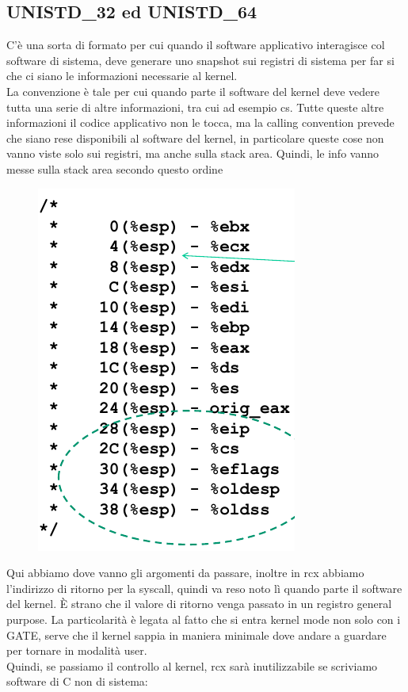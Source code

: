 \documentclass[12pt, oneside]{extbook}
\begin{document}
\subsection{UNISTD\_32 ed UNISTD\_64}
C'è una sorta di formato per cui quando il software applicativo interagisce col software di sistema, deve generare uno snapshot sui registri di sistema per far si che ci siano le informazioni necessarie al kernel.\\ La convenzione è tale per cui quando parte il software del kernel deve vedere tutta una serie di altre informazioni, tra cui ad esempio cs. Tutte queste altre informazioni il codice applicativo non le tocca, ma la calling convention prevede che siano rese disponibili al software del kernel, in particolare queste cose non vanno viste solo sui registri, ma anche sulla stack area. Quindi, le info vanno messe sulla stack area secondo questo ordine
\begin{figure}[!h]
	\includegraphics[scale=0.3]{immagini/unistd_call_conv.png}
\end{figure}
Qui abbiamo dove vanno gli argomenti da passare, inoltre in rcx abbiamo l'indirizzo di ritorno per la syscall, quindi va reso noto lì quando parte il software del kernel. È strano che il valore di ritorno venga passato in un registro general purpose. La particolarità è legata al fatto che si entra kernel mode non solo con i GATE, serve che il kernel sappia in maniera minimale dove andare a guardare per tornare in modalità user.\\ Quindi, se passiamo il controllo al kernel, rcx sarà inutilizzabile se scriviamo software di C non di sistema:
\end{document}
